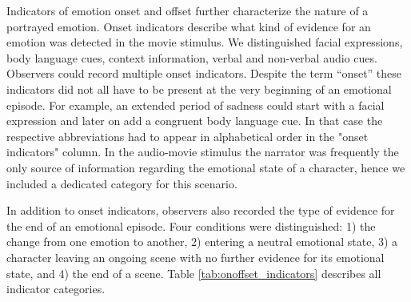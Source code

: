 Indicators of emotion onset and offset further characterize the nature of a
portrayed emotion. Onset indicators describe what kind of evidence for an
emotion was detected in the movie stimulus. We distinguished facial
expressions, body language cues, context information, verbal and non-verbal
audio cues. Observers could record multiple onset indicators. Despite the term
``onset'' these indicators did not all have to be present at the very beginning
of an emotional episode. For example, an extended period of sadness could start
with a facial expression and later on add a congruent body language cue. In that case the respective abbreviations had to appear in alphabetical order in the "onset indicators" column. In
the audio-movie stimulus the narrator was frequently the only source of
information regarding the emotional state of a character, hence we included a
dedicated category for this scenario.

In addition to onset indicators, observers also recorded the type of evidence
for the end of an emotional episode. Four conditions were distinguished: 1) the
change from one emotion to another, 2) entering a neutral emotional state, 3) a
character leaving an ongoing scene with no further evidence for its emotional
state, and 4) the end of a scene.  Table \ref{tab:onoffset_indicators}
describes all indicator categories.

